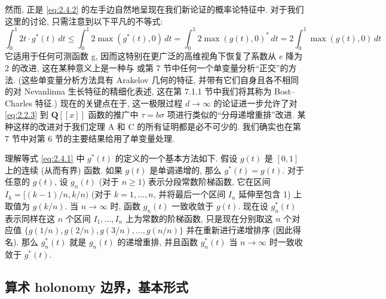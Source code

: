 然而, 正是 \eqref{eq:2.4.2} 的左手边自然地呈现在我们新论证的概率论特征中.
对于我们这里的讨论, 只需注意到以下平凡的不等式:
\begin{equation}\label{eq:2.4.3}
\int_0^1 2t \cdot g^*(t) \, dt \le \int_0^1 2 \max(g^*(t), 0) \, dt = \int_0^1 2 \max(g(t), 0)^* \, dt = 2 \int_0^1 \max(g(t), 0) \, dt
\end{equation}
它适用于任何可测函数 g, 
因而这特别在更广泛的高维视角下恢复了系数从 $e$ 降为 $2$ 的改进, 
这在某种意义上是一种与 \cite{BC22} 或第 7 节中任何一个单变量分析``正交''的方法.
(这些单变量分析方法具有 Arakelov 几何的特征, 
并带有它们自身且各不相同的对 Nevanlinna 生长特征的精细化表述, 
这在第 7.1.1 节中我们将其称为 Bost--Charles 特征.) 
现在的关键点在于, 这一极限过程 $d \to \infty$ 的论证进一步允许了对 \eqref{eq:2.2.3} 到 \(\mathbf{Q}[\! [x]\!]\) 函数的推广中 \(\tau = b\sigma\) 项进行类似的``分母递增重排''改进.
某种这样的改进对于我们定理 A 和 C 的所有证明都是必不可少的.
我们确实也在第 7 节中对第 6 节的主要结果给用了单变量处理.

\begin{remark}[基本注记 2.4.4]\label{rem:2.4.4}
理解等式 \eqref{eq:2.4.1} 中 $g^*(t)$ 的定义的一个基本方法如下. 
假设 $g(t)$ 是 $[0, 1]$ 上的连续 (从而有界) 函数. 如果 $g(t)$ 是单调递增的, 那么 $g^*(t) = g(t)$. 对于任意的 $g(t)$, 设 $g_n(t)$ (对于 $n \ge 1$) 表示分段常数阶梯函数, 
它在区间 $I_k = [(k-1)/n, k/n)$ (对于 $k = 1, \ldots, n$, 并将最后一个区间 $I_n$ 延伸至包含 1) 上取值为 $g(k/n)$. 当 $n \to \infty$ 时, 函数 $g_n(t)$ 一致收敛于 $g(t)$. 现在设 $g_n^*(t)$ 表示同样在这 $n$ 个区间 $I_1, \ldots, I_n$ 上为常数的阶梯函数, 
只是现在分别取这 $n$ 个对应值 $\{g(1/n), g(2/n), g(3/n), \dots, g(n/n)\}$ 并在重新进行递增排序 (因此得名). 
那么 $g_n^*(t)$ 就是 $g_n(t)$ 的递增重排, 
并且函数 $g_n^*(t)$ 当 $n \to \infty$ 时一致收敛于 $g^*(t)$. \end{remark}

\subsection{算术 holonomy 边界，基本形式}\label{sec:2.5}

